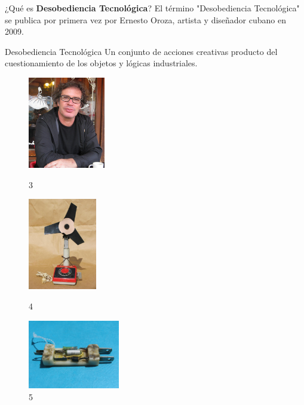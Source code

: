 \documentclass[spanish]{beamer}
\begin{document}
\begin{frame}{¿Qué es \textbf{Desobediencia Tecnológica}?}
    El término "Desobediencia Tecnológica" se publica por primera vez por Ernesto Oroza, artista y diseñador cubano en 2009.
    \begin{block}{Desobediencia Tecnológica}
        Un conjunto de acciones creativas producto del cuestionamiento de los objetos y lógicas industriales.    
    \end{block}
    \vspace{0.3cm}
    
    \centering
    \begin{figure}      
            \includegraphics[height=4cm]{img/ernestooroza.jpg}
            \vspace*{-3mm}
            \caption{ 3}
        \endminipage\hfill
            \includegraphics[height=4cm]{img/inventos/ventilador.jpg}
            \vspace*{-3mm}
            \caption{ 4}
        \endminipage\hfill
            \includegraphics[height=3cm]{img/inventos/battery_charger.jpg}
            \vspace*{-3mm}
            \caption{ 5}
        \endminipage\hfill
    \end{figure}    
\end{frame}
\end{document}
